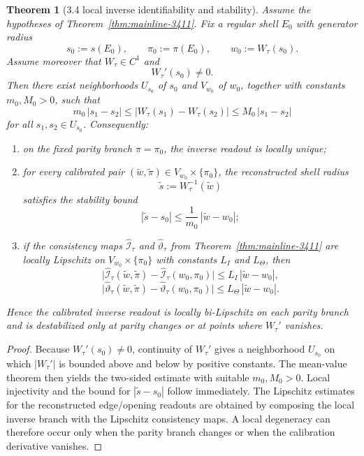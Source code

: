 \documentclass[12pt,a4paper]{article}
\newtheorem{theorem}{Theorem}[section]
\begin{document}
\begin{theorem}[3.4 local inverse identifiability and stability]
\label{thm:mainline-3412}
Assume the hypotheses of Theorem~\ref{thm:mainline-3411}. Fix a regular shell $E_0$ with generator radius
\[
 s_0:=s(E_0),
 \qquad
 \pi_0:=\pi(E_0),
 \qquad
 w_0:=W_\tau(s_0).
\]
Assume moreover that $W_\tau\in C^1$ and
\[
 W_\tau'(s_0)\neq 0.
\]
Then there exist neighborhoods $U_{s_0}$ of $s_0$ and $V_{w_0}$ of $w_0$, together with constants $m_0,M_0>0$, such that
\[
 m_0\,|s_1-s_2|
 \le
 |W_\tau(s_1)-W_\tau(s_2)|
 \le
 M_0\,|s_1-s_2|
\]
for all $s_1,s_2\in U_{s_0}$. Consequently:
\begin{enumerate}[label=(\roman*)]
 \item on the fixed parity branch $\pi=\pi_0$, the inverse readout is locally unique;
 \item for every calibrated pair $(\widetilde w,\widetilde\pi)\in V_{w_0}\times\{\pi_0\}$, the reconstructed shell radius
 \[
 \widetilde s:=W_\tau^{-1}(\widetilde w)
 \]
 satisfies the stability bound
 \[
 |\widetilde s-s_0|
 \le
 \frac{1}{m_0}\,|\widetilde w-w_0|;
 \]
 \item if the consistency maps $\widehat{\mathcal I}_\tau$ and $\widehat{\vartheta}_\tau$ from Theorem~\ref{thm:mainline-3411} are locally Lipschitz on $V_{w_0}\times\{\pi_0\}$ with constants $L_I$ and $L_\Theta$, then
 \[
 \bigl|\widehat{\mathcal I}_\tau(\widetilde w,\widetilde\pi)-\widehat{\mathcal I}_\tau(w_0,\pi_0)\bigr|
 \le L_I\,|\widetilde w-w_0|,
 \]
 \[
 \bigl|\widehat{\vartheta}_\tau(\widetilde w,\widetilde\pi)-\widehat{\vartheta}_\tau(w_0,\pi_0)\bigr|
 \le L_\Theta\,|\widetilde w-w_0|.
 \]
\end{enumerate}
Hence the calibrated inverse readout is locally bi-Lipschitz on each parity branch and is destabilized only at parity changes or at points where $W_\tau'$ vanishes.
\end{theorem}

\begin{proof}
Because $W_\tau'(s_0)\neq 0$, continuity of $W_\tau'$ gives a neighborhood $U_{s_0}$ on which $|W_\tau'|$ is bounded above and below by positive constants. The mean-value theorem then yields the two-sided estimate with suitable $m_0,M_0>0$. Local injectivity and the bound for $|\widetilde s-s_0|$ follow immediately. The Lipschitz estimates for the reconstructed edge/opening readouts are obtained by composing the local inverse branch with the Lipschitz consistency maps. A local degeneracy can therefore occur only when the parity branch changes or when the calibration derivative vanishes.
\end{proof}
\end{document}
